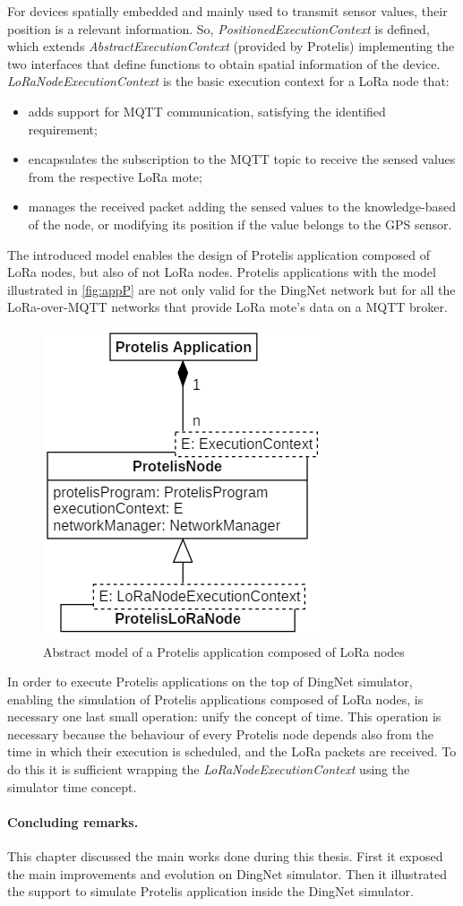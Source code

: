 \noindent For devices spatially embedded and mainly used to transmit sensor values, their position is a relevant information. So, \mbox{\textit{PositionedExecutionContext}} is defined, which extends \mbox{\textit{AbstractExecutionContext}} (provided by Protelis) implementing the two interfaces that define functions to obtain spatial information of the device.
\mbox{\textit{LoRaNodeExecutionContext}} is the basic execution context for a LoRa node that:
% 
\begin{itemize}
    \item adds support for MQTT communication, satisfying the identified requirement;
    \item encapsulates the subscription to the MQTT topic to receive the sensed values from the respective LoRa mote;
    \item manages the received packet adding the sensed values to the knowledge-based of the node, or modifying its position if the value belongs to the GPS sensor.
\end{itemize}
% 
The introduced model enables the design of Protelis application composed of LoRa nodes, but also of not LoRa nodes.
Protelis applications with the model illustrated in \autoref{fig:appP} are not only valid for the DingNet network but for all the LoRa-over-MQTT networks that provide LoRa mote's data on a MQTT broker.
% 
\begin{figure}[h]
    \centering
    \includegraphics{figures/app.png}
    \caption{Abstract model of a Protelis application composed of LoRa nodes}
    \label{fig:appP}
\end{figure}
% 
\noindent In order to execute Protelis applications on the top of DingNet simulator, enabling the simulation of Protelis applications composed of LoRa nodes, is necessary one last small operation: unify the concept of time. 
This operation is necessary because the behaviour of every Protelis node depends also from the time in which their execution is scheduled, and the LoRa packets are received.
To do this it is sufficient wrapping the \mbox{\textit{LoRaNodeExecutionContext}} using the simulator time concept.

\paragraph{Concluding remarks.} This chapter discussed the main works done during this thesis. First it exposed the main improvements and evolution on DingNet simulator. Then it illustrated the support to simulate Protelis application inside the DingNet simulator.
